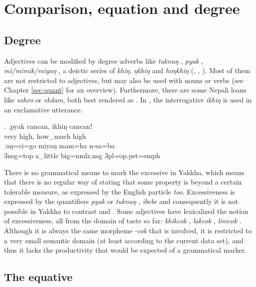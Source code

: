 \section{Comparison, equation and degree}\label{sec-compar}
\subsection{Degree}

Adjectives can be modified by degree adverbs like \emph{tuknuŋ} , \emph{pyak} , \emph{mi/mimik/miyaŋ} , a deictic series of \emph{khiŋ}, \emph{ŋkhiŋ} and \emph{hoŋkhiŋ} (, , ). Most of them are not restricted to adjectives, but may also be used with nouns or verbs (see Chapter \ref{sec-quant} for an overview). Furthermore, there are some Nepali loans like \emph{sahro} or \emph{ekdam}, both best rendered as . In \Next[a], the interrogative \emph{ikhiŋ}  is used in an exclamative utterance. 

\ex. \ag.pyak cancan, ikhiŋ   cancan!\\
		very high, how\_much high\\
	 
 	\bg.uŋ=ci=go  miyaŋ mam=ha n-sa=ba\\
	{\sc 3nsg=top} a\_little big{\sc =nmlz.nsg} {\sc 3pl-cop.pst=emph}		\\
	 

	
There is no grammatical means to mark the excessive in Yakkha, which means that there is no regular way of stating that some property is beyond a certain tolerable measure, as expressed by the English particle \emph{too}. Excessiveness is expressed by the quantifiers \emph{pyak}  or 
\emph{tuknuŋ} , \emph{ibebe}  and consequently it is not possible in Yakkha to contrast  and . Some adjectives have lexicalized the notion of excessiveness, all from the  domain of taste so far: \emph{khikcok} , \emph{lakcok} , \emph{limcok} . Although it is  always the same morpheme \emph{-cok} that is involved, it is restricted to a very small semantic domain (at least according to the current data set), and thus it lacks the productivity that would be expected of a grammatical marker.


\subsection{The equative}\label{sec-equ}

